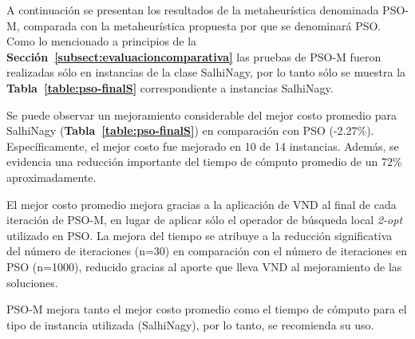 A continuación se presentan los resultados de la metaheurística denominada PSO-M, comparada con la metaheurística propuesta por \cite{mpso} que se denominará PSO.\\

Como lo mencionado a principios de la \textbf{Sección~\ref{subsect:evaluacioncomparativa}} las pruebas de PSO-M fueron realizadas sólo en instancias de la clase SalhiNagy, por lo tanto sólo se muestra la \textbf{Tabla~\ref{table:pso-finalS}} correspondiente a instancias SalhiNagy. 

Se puede observar un mejoramiento considerable del mejor costo promedio para SalhiNagy (\textbf{Tabla~\ref{table:pso-finalS}}) en comparación con PSO (-2.27\%). Específicamente, el mejor costo fue mejorado en 10 de 14 instancias. Además, se evidencia una reducción importante del tiempo de cómputo promedio de un 72\% aproximadamente.

El mejor costo promedio mejora gracias a la aplicación de VND al final de cada iteración de PSO-M, en lugar de aplicar sólo el operador de búsqueda local \emph{2-opt} utilizado en PSO. La mejora del tiempo se atribuye a la reducción significativa del número de iteraciones (n=30) en comparación con el número de iteraciones en PSO (n=1000), reducido gracias al aporte que lleva VND al  mejoramiento de las soluciones.

PSO-M mejora tanto el mejor costo promedio como el tiempo de cómputo para el tipo de instancia utilizada (SalhiNagy), por lo tanto, se recomienda su uso.

%

